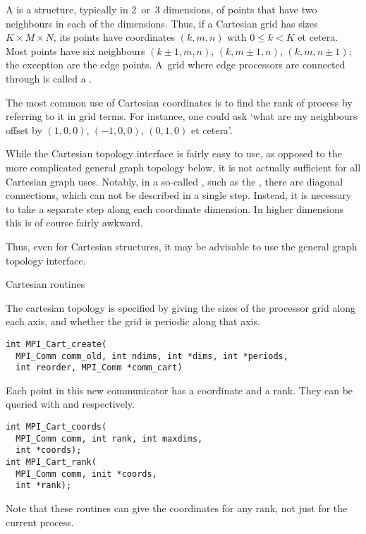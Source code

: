 A  is a structure, typically in 2~or~3 dimensions,
of points that have two neighbours in each of the dimensions.
Thus, if a Cartesian grid has sizes $K\times M\times N$, its
points have coordinates $(k,m,n)$ with $0\leq k<K$ et cetera.
Most points have six neighbours $(k\pm1,m,n)$, $(k,m\pm1,n)$, $(k,m,n\pm1)$;
the exception are the edge points. A~grid where edge processors
are connected through  is called
a .

The most common use of Cartesian coordinates
is to find the rank of process by referring to it in grid terms.
For instance, one could ask `what are my neighbours offset by $(1,0,0)$, 
$(-1,0,0)$, $(0,1,0)$ et cetera'.

While the Cartesian topology interface is fairly easy to use, as
opposed to the more complicated general graph topology below, it is
not actually sufficient for all Cartesian graph uses. Notably, in
a so-called , such as the
, there are diagonal connections,
which can not be described in a single step. Instead, it is necessary
to take a separate step along each coordinate dimension. In higher
dimensions this is of course fairly awkward.

Thus, even for Cartesian structures, it may be advisable to use the
general graph topology interface.

 {Cartesian routines}

The cartesian topology is specified by giving
 the sizes of the processor grid along
each axis, and whether the grid is periodic along that axis.

\begin{lstlisting}
int MPI_Cart_create(
  MPI_Comm comm_old, int ndims, int *dims, int *periods, 
  int reorder, MPI_Comm *comm_cart)
\end{lstlisting}

Each point in this new communicator has a coordinate and a rank.  They
can be queried with  and
 respectively.

\begin{lstlisting}
int MPI_Cart_coords(
  MPI_Comm comm, int rank, int maxdims,
  int *coords);
int MPI_Cart_rank(
  MPI_Comm comm, init *coords, 
  int *rank);
\end{lstlisting}

Note that these routines can give the coordinates for any rank,
not just for the current process.
%

